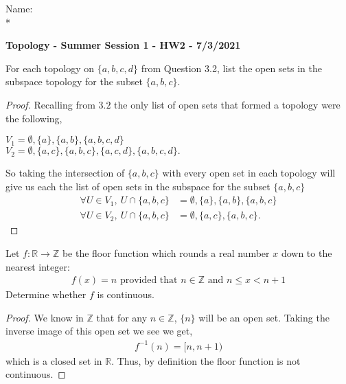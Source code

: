 \documentclass[12pt]{article}
\newcommand      {\Zm}         {{\mathbb Z}}
\newcommand      {\Rm}         {{\mathbb R}}
\begin{document}
\begin{flushright}
    Name:  \\*
    
\end{flushright}
\begin{center}
    {\bf Topology - Summer Session 1 - HW2 - 7/3/2021}
\end{center}

  For each topology on $\{a, b, c, d\}$ from Question 3.2, list the open sets in the subspace topology for the subset $\{a, b, c\}$.
\begin{proof}
    Recalling from $3.2$ the only list of open sets that formed a topology were the following,
    \begin{center}
        $V_1 = \emptyset, \{a\}, \{a,b\}, \{a,b,c,d\}$ \\
        $V_2 = \emptyset, \{a,c\}, \{a,b,c\}, \{a,c,d\}, \{a,b,c,d\}.$ 
    \end{center}
    So taking the intersection of $\{a,b,c\}$ with every open set in each topology will give us each the list of open sets in the subspace for the subset $\{a,b,c\}$
    \begin{align*}
        \forall U \in V_1,\ U\cap \{a,b,c\} &= \emptyset, \{a\}, \{a,b\},\{a,b,c\} \\
        \forall U \in V_2,\ U \cap \{a,b,c\} &= \emptyset, \{a,c\},\{a,b,c\}.
    \end{align*}

\end{proof}

 Let $f:\Rm \to \Zm$ be the floor function which rounds a real number $x$ down to the nearest integer:
\begin{align*}
    f(x) = n \text{ provided that } n \in \Zm \text{ and } n \leq x < n+1
\end{align*}
Determine whether $f$ is continuous. 

\begin{proof}
    We know in $\Zm$ that for any $n\in \Zm$, $\{n\}$ will be an open set. Taking the inverse image of this open set we see we get,
    \begin{align*}
        f^{-1}(n) = [n,n+1)
    \end{align*}
    which is a closed set in $\Rm$. Thus, by definition the floor function is not continuous.
\end{proof}
\end{document}
